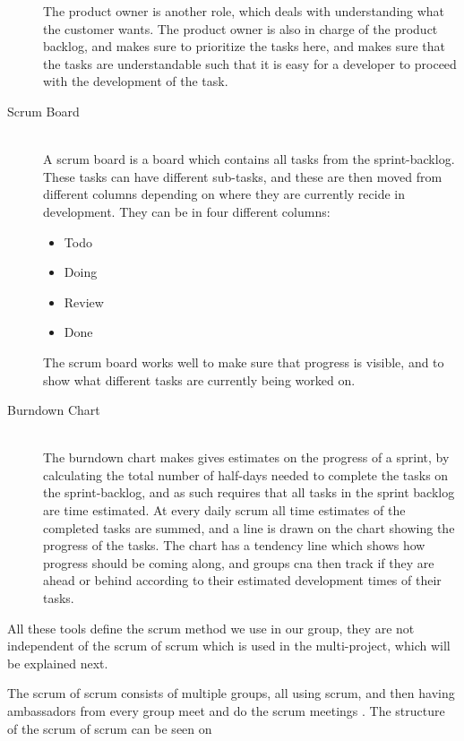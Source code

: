 \begin{description}
	The product owner is another role, which deals with understanding what the customer wants.
	The product owner is also in charge of the product backlog, and makes sure to prioritize the tasks here, and makes sure that the tasks are understandable such that it is easy for a developer to proceed with the development of the task.
	\item[Scrum Board] \hfill \\
	A scrum board is a board which contains all tasks from the sprint-backlog.
	These tasks can have different sub-tasks, and these are then moved from different columns depending on where they are currently recide in development.
	They can be in four different columns:
	\begin{itemize}
		\item Todo
		\item Doing
		\item Review
		\item Done
	\end{itemize}
	The scrum board works well to make sure that progress is visible, and to show what different tasks are currently being worked on.
	\item[Burndown Chart] \hfill \\
	The burndown chart makes gives estimates on the progress of a sprint, by calculating the total number of half-days needed to complete the tasks on the sprint-backlog, and as such requires that all tasks in the sprint backlog are time estimated.
	At every daily scrum all time estimates of the completed tasks are summed, and a line is drawn on the chart showing the progress of the tasks.
	The chart has a tendency line which shows how progress should be coming along, and groups cna then track if they are ahead or behind according to their estimated development times of their tasks.
\end{description}

All these tools define the scrum method we use in our group, they are not independent of the scrum of scrum which is used in the multi-project, which will be explained next.

The scrum of scrum consists of multiple groups, all using scrum, and then having ambassadors from every group meet and do the scrum meetings \cite{SCRUMBOOK}.
The structure of the scrum of scrum can be seen on 

